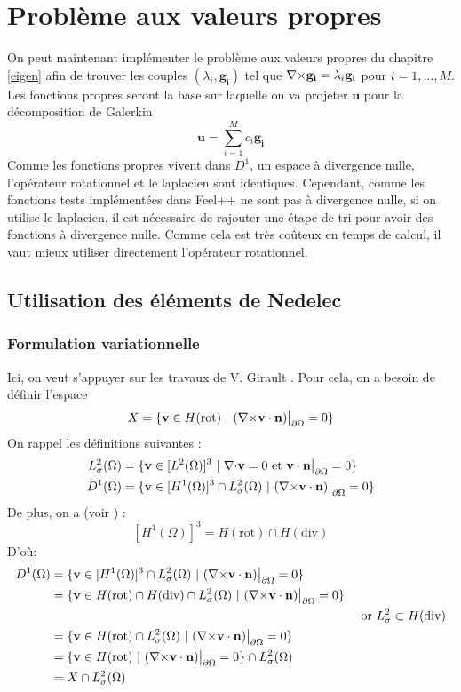\chapter{Problème aux valeurs propres}
On peut maintenant implémenter le problème aux valeurs propres du chapitre \ref{eigen} afin de trouver les couples $(\lambda_i,\mathbf{g_i})$ tel que ${\nabla\times}\mathbf{g_i}=\lambda_i\mathbf{g_i}$ pour $i=1,\dots,M$. Les fonctions propres seront la base sur laquelle on va projeter $\mathbf{u}$ pour la décomposition de Galerkin \[ \mathbf{u}=\sum_{i=1}^M c_i\mathbf{g_i} \]
Comme les fonctions propres vivent dans $D^1$, un espace à divergence nulle, l'opérateur rotationnel et le laplacien sont identiques. Cependant, comme les fonctions tests implémentées dans Feel++ ne sont pas à divergence nulle, si on utilise le laplacien, il est nécessaire de rajouter une étape de tri pour avoir des fonctions à divergence nulle. Comme cela est très coûteux en temps de calcul, il vaut mieux utiliser directement l'opérateur rotationnel.

\section{Utilisation des éléments de Nedelec}
\subsection{Formulation variationnelle}
Ici, on veut s'appuyer sur les travaux de V. Girault \cite{girault90-1}. Pour cela, on a besoin de définir l'espace \[X = \{\mathbf{v}\in H(\mathrm{rot})\ |\ (\rot\mathbf{v}\cdot\mathbf{n})\restr=0 \}\]
On rappel les définitions suivantes :
\begin{align*}
L^2_\sigma(\Omega) &= \{\mathbf{v} \in [L^2(\Omega)]^3\ |\ {\nabla\cdot} \mathbf{v} = 0\text{ et }\mathbf{v}\cdot \mathbf{n}{\big\rvert_{\partial\Omega}} = 0 \}\\
D^1(\Omega) &= \{\mathbf{v} \in [H^1(\Omega)]^3\cap L^2_\sigma(\Omega)\ |\ ({\nabla\times} \mathbf{v}\cdot \mathbf{n}){\big\rvert_{\partial\Omega}} = 0  \}
\end{align*}
De plus, on a (voir \cite{Girault79}) :
\[ [H^1(\Omega)]^3=H(\mathrm{rot})\cap H(\mathrm{div}) \]
D'où:
\begin{align*}
D^1(\Omega) &= \{\mathbf{v}\in [H^1(\Omega)]^3\cap L^2_\sigma(\Omega)\ |\ ({\nabla\times} \mathbf{v}\cdot \mathbf{n}){\big\rvert_{\partial\Omega}} = 0  \}&\\
&=\{\mathbf{v}\in H(\mathrm{rot})\cap H(\mathrm{div})\cap L^2_\sigma(\Omega)\ |\ ({\nabla\times} \mathbf{v}\cdot \mathbf{n}){\big\rvert_{\partial\Omega}} = 0  \}&\\
&&\text{ or }L^2_\sigma\subset H(\mathrm{div})\\
&=\{\mathbf{v}\in H(\mathrm{rot})\cap L^2_\sigma(\Omega)\ |\ ({\nabla\times} \mathbf{v}\cdot \mathbf{n}){\big\rvert_{\partial\Omega}} = 0  \}&\\
&=\{\mathbf{v}\in H(\mathrm{rot})\ |\ ({\nabla\times} \mathbf{v}\cdot \mathbf{n}){\big\rvert_{\partial\Omega}} = 0  \}\cap L^2_\sigma(\Omega)&\\
&=X\cap L^2_\sigma(\Omega)&
\end{align*}

